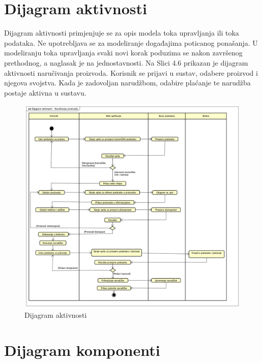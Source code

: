 		 \section{Dijagram aktivnosti}
			
			
		 \textnormal{Dijagram aktivnosti primjenjuje se za opis modela toka upravljanja ili toka podataka. Ne upotrebljava se za modeliranje događajima poticanog ponašanja. U modeliranju toka upravljanja svaki novi korak poduzima se nakon završenog prethodnog, a naglasak je na jednostavnosti. Na Slici 4.6 prikazan je dijagram aktivnosti naručivanja proizvoda. Korisnik se prijavi u sustav, odabere proizvod i njegova svojstva. Kada je zadovoljan narudžbom, odabire plaćanje te narudžba postaje aktivna u sustavu.}
		
		\begin{figure}[H]
			\includegraphics[width=\linewidth]{dijagrami/Dijagram_aktivnosti.png}
			\centering
			\caption{Dijagram aktivnosti }
			\label{fig:ClassDiagram1}
		\end{figure}
			
			\eject
		\section{Dijagram komponenti}
		

